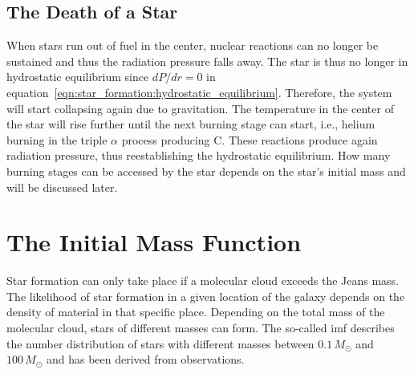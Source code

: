 \subsection{The Death of a Star}

When stars run out of fuel in the center, nuclear reactions can no longer be sustained and thus the radiation pressure falls away. The star is thus no longer in hydrostatic equilibrium since $dP/dr = 0$ in equation~\eqref{eqn:star_formation:hydrostatic_equilibrium}. Therefore, the system will start collapsing again due to gravitation. The temperature in the center of the star will rise further until the next burning stage can start, i.e., helium burning in the triple $\alpha$ process producing C. These reactions produce again radiation pressure, thus reestablishing the hydrostatic equilibrium. How many burning stages can be accessed by the star depends on the star's initial mass and will be discussed later. 

    

\section{The Initial Mass Function}

Star formation can only take place if a molecular cloud exceeds the Jeans mass. The likelihood of star formation in a given location of the galaxy depends on the density of material in that specific place. Depending on the total mass of the molecular cloud, stars of different masses can form. The so-called \ac{imf} describes the number distribution of stars with different masses between $0.1\,M_\odot$ and $100\,M_\odot$ and has been derived from observations. 

